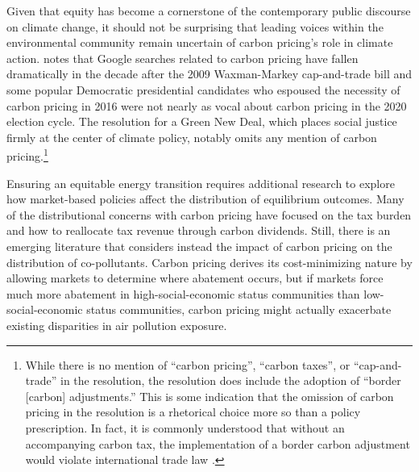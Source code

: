 \documentclass[11pt]{article}
\begin{document}
Given that equity has become a cornerstone of the contemporary public discourse on climate change, it should not be surprising that leading voices within the environmental community remain uncertain of carbon pricing's role in climate action. \cite{fischer2021green} notes that Google searches related to carbon pricing have fallen dramatically in the decade after the 2009 Waxman-Markey cap-and-trade bill and some popular Democratic presidential candidates who espoused the necessity of carbon pricing in 2016 were not nearly as vocal about carbon pricing in the 2020 election cycle. The resolution for a Green New Deal, which places social justice firmly at the center of climate policy, notably omits any mention of carbon pricing.\footnote{While there is no mention of ``carbon pricing'', ``carbon taxes'', or ``cap-and-trade'' in the resolution, the resolution does include the adoption of ``border [carbon] adjustments.'' This is some indication that the omission of carbon pricing in the resolution is a rhetorical choice more so than a policy prescription. In fact, it is commonly understood that without an accompanying carbon tax, the implementation of a border carbon adjustment would violate international trade law \citep{cosbey2019developing}.} 

Ensuring an equitable energy transition requires additional research to explore how market-based policies affect the distribution of equilibrium outcomes. Many of the distributional concerns with carbon pricing have focused on the tax burden and how to reallocate tax revenue through carbon dividends. Still, there is an emerging literature that considers instead the impact of carbon pricing on the distribution of co-pollutants. Carbon pricing derives its cost-minimizing nature by allowing markets to determine where abatement occurs, but if markets force much more abatement in high-social-economic status communities than low-social-economic status communities, carbon pricing might actually exacerbate existing disparities in air pollution exposure.

\end{document}
